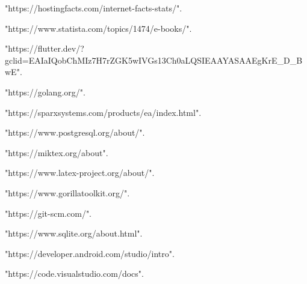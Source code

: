 \begin{thebibliography}{4}
	"https://hostingfacts.com/internet-facts-stats/".

	"https://www.statista.com/topics/1474/e-books/".

	"https://flutter.dev/?gclid=EAIaIQobChMIz7H7rZGK5wIVGs13Ch0aLQSIEAAYASAAEgKrE\_D\_BwE".

	"https://golang.org/".

	"https://sparxsystems.com/products/ea/index.html".

	"https://www.postgresql.org/about/".

	"https://miktex.org/about".

	"https://www.latex-project.org/about/".

	"https://www.gorillatoolkit.org/".

	"https://git-scm.com/".

	"https://www.sqlite.org/about.html".

	"https://developer.android.com/studio/intro".

	"https://code.visualstudio.com/docs".





\end{thebibliography}
